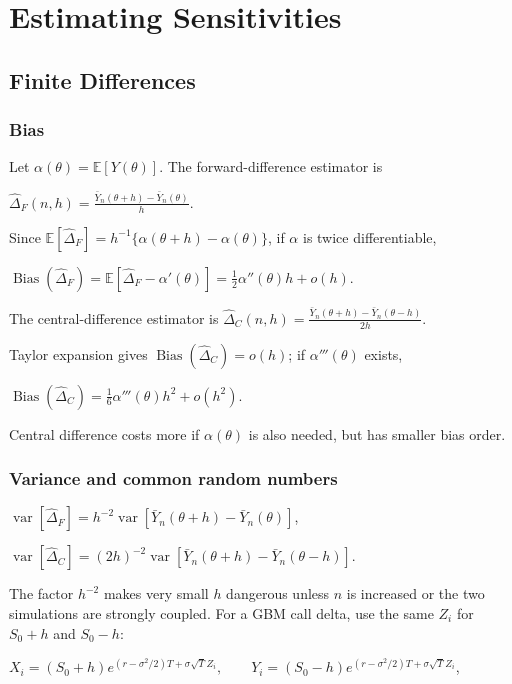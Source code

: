 \section{Estimating Sensitivities}

\subsection{Finite Differences}

\subsubsection*{Bias}

Let $\alpha(\theta)=\mathbb{E}[Y(\theta)]$. The forward-difference estimator is

$\hat\Delta_F(n,h)=\frac{\bar Y_n(\theta+h)-\bar Y_n(\theta)}{h}$.

Since $\mathbb{E}[\hat\Delta_F]=h^{-1}\{\alpha(\theta+h)-\alpha(\theta)\}$, if $\alpha$ is twice differentiable,

$\operatorname{Bias}(\hat\Delta_F)=\mathbb{E}[\hat\Delta_F-\alpha'(\theta)]=\frac12\alpha''(\theta)h+o(h)$.

The central-difference estimator is
$\hat\Delta_C(n,h)=\frac{\bar Y_n(\theta+h)-\bar Y_n(\theta-h)}{2h}$.

Taylor expansion gives $\operatorname{Bias}(\hat\Delta_C)=o(h)$; if $\alpha'''(\theta)$ exists,

$\operatorname{Bias}(\hat\Delta_C)=\frac16\alpha'''(\theta)h^2+o(h^2)$.

Central difference costs more if $\alpha(\theta)$ is also needed, but has smaller bias order.

\subsubsection*{Variance and common random numbers}

$\operatorname{var}[\hat\Delta_F]=h^{-2}\operatorname{var}[\bar Y_n(\theta+h)-\bar Y_n(\theta)]$,

$\operatorname{var}[\hat\Delta_C]=(2h)^{-2}\operatorname{var}[\bar Y_n(\theta+h)-\bar Y_n(\theta-h)]$.

The factor $h^{-2}$ makes very small $h$ dangerous unless $n$ is increased or the two simulations are strongly coupled. For a GBM call delta, use the same $Z_i$ for $S_0+h$ and $S_0-h$:

$X_i=(S_0+h)e^{(r-\sigma^2/2)T+\sigma\sqrt T Z_i},\qquad Y_i=(S_0-h)e^{(r-\sigma^2/2)T+\sigma\sqrt T Z_i}$,


